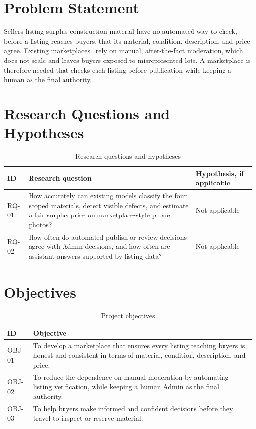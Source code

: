 \section{Problem Statement}
Sellers listing surplus construction material have no automated way to check,
before a listing reaches buyers, that its material, condition, description, and
price agree. Existing marketplaces~\citep{olxpakistan,facebookmarketplace} rely on
manual, after-the-fact moderation, which does not scale and leaves buyers exposed
to misrepresented lots. A marketplace is therefore needed that checks each listing
before publication while keeping a human as the final authority.

\section{Research Questions and Hypotheses }
\begin{table}[H]
\centering
\caption{Research questions and hypotheses}
\label{tab:research-questions}
\begin{tabularx}{\textwidth}{@{}p{}X X@{}}
\toprule
\textbf{ID} & \textbf{Research question} & \textbf{Hypothesis, if applicable} \\
\midrule
RQ-01 & How accurately can existing models classify the four scoped materials, detect visible defects, and estimate a fair surplus price on marketplace-style phone photos? & Not applicable \\
RQ-02 & How often do automated publish-or-review decisions agree with Admin decisions, and how often are assistant answers supported by listing data? & Not applicable \\
\bottomrule
\end{tabularx}
\end{table}

\section{Objectives}
\begin{table}[H]
\centering
\caption{Project objectives}
\label{tab:objectives}
\begin{tabularx}{\textwidth}{@{}p{}X@{}}
\toprule
\textbf{ID} & \textbf{Objective} \\
\midrule
OBJ-01 & To develop a marketplace that ensures every listing reaching buyers is honest and consistent in terms of material, condition, description, and price. \\
OBJ-02 & To reduce the dependence on manual moderation by automating listing verification, while keeping a human Admin as the final authority. \\
OBJ-03 & To help buyers make informed and confident decisions before they travel to inspect or reserve material. \\
\bottomrule
\end{tabularx}
\end{table}

